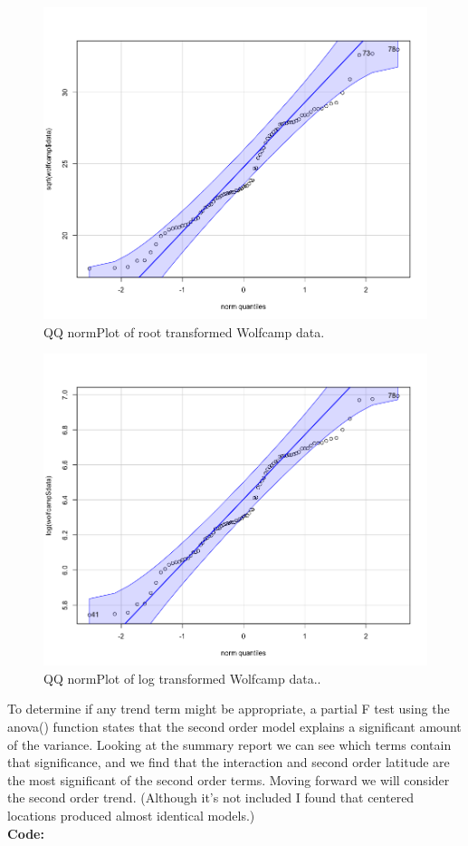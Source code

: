 \documentclass[12pt]{article}
\makeatletter
\theoremstyle{homework}
\newenvironment{exercise}[1]
{\def\@currentlabel{#1}\exercisecore}
{\endexercisecore}
\makeatother
\begin{document}
\begin{exercise}{2}
\begin{figure}[H]
\begin{center}
      \caption{QQ normPlot of root transformed Wolfcamp data.}
    \includegraphics[width = .75\textwidth]{root.png}
    \end{center}
  \end{figure}
  \begin{figure}[H]
    \begin{center}
      \caption{QQ normPlot of log transformed Wolfcamp data..}
    \includegraphics[width = .75\textwidth]{log.png}
    \end{center}
  \end{figure}

  To determine if any trend term might be appropriate, a partial F test using the anova() function states that the second order model 
  explains a significant amount of the variance. Looking at the summary report we can see which terms contain that significance, and we find 
  that the interaction and second order latitude are the most significant of the second order terms. Moving forward we will consider the second order trend. (Although it's not included 
  I found that centered locations produced almost identical models.) \\
  \textbf{Code:}
  \begin{center}
  
  \end{center}
  




\end{exercise}
\end{document}
